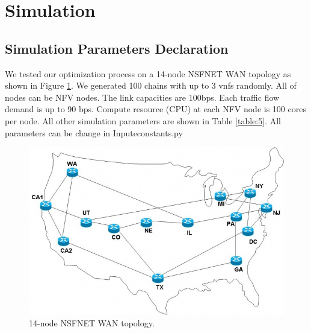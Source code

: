 \documentclass[12pt]{article}
\begin{document}
\section{Simulation}
\subsection{Simulation Parameters Declaration}
We tested our optimization process on a 14-node NSFNET WAN topology as shown in Figure \ref{network}. We generated 100 chains with up to 3 vnfs randomly. All of nodes can be NFV nodes. The link capacities are 100bps. Each traffic flow demand is up to 90 bps. Compute resource (CPU) at each NFV node is 100 cores per node. All other simulation parameters are shown in Table \ref{table:5}. All parameters can be change in Inputeconstants.py
\begin{figure}[t!]
\label{network}
\includegraphics[scale=0.5]{nsfnet.jpg}
\caption{14-node NSFNET WAN topology.}
\end{figure}
\end{document}
